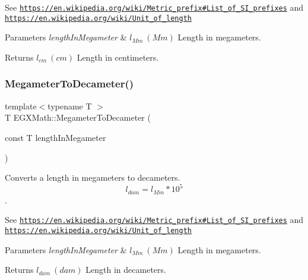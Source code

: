 See \href{https://en.wikipedia.org/wiki/Metric_prefix#List_of_SI_prefixes}{\tt https\+://en.\+wikipedia.\+org/wiki/\+Metric\+\_\+prefix\#\+List\+\_\+of\+\_\+\+S\+I\+\_\+prefixes} and \href{https://en.wikipedia.org/wiki/Unit_of_length}{\tt https\+://en.\+wikipedia.\+org/wiki/\+Unit\+\_\+of\+\_\+length} 
\begin{DoxyParams}{Parameters}
{\em length\+In\+Megameter} & $ l_{Mm}\ (Mm)$ Length in megameters. \\
\hline
\end{DoxyParams}
\begin{DoxyReturn}{Returns}
$ l_{cm}\ (cm)$ Length in centimeters. 
\end{DoxyReturn}
\mbox{\label{group___e_g_x_math-_conversions-_length_conversions-_megameter-_s_i_ga7e758185a466f8ac5f956650312b9019}} 
\subsubsection{\texorpdfstring{Megameter\+To\+Decameter()}{MegameterToDecameter()}}
{\footnotesize\ttfamily template$<$typename T $>$ \\
T E\+G\+X\+Math\+::\+Megameter\+To\+Decameter (\begin{DoxyParamCaption}\item[{const T}]{length\+In\+Megameter }\end{DoxyParamCaption})}



Converts a length in megameters to decameters. \[ l_{dam}=l_{Mm} * 10^{5} \]. 

See \href{https://en.wikipedia.org/wiki/Metric_prefix#List_of_SI_prefixes}{\tt https\+://en.\+wikipedia.\+org/wiki/\+Metric\+\_\+prefix\#\+List\+\_\+of\+\_\+\+S\+I\+\_\+prefixes} and \href{https://en.wikipedia.org/wiki/Unit_of_length}{\tt https\+://en.\+wikipedia.\+org/wiki/\+Unit\+\_\+of\+\_\+length} 
\begin{DoxyParams}{Parameters}
{\em length\+In\+Megameter} & $ l_{Mm}\ (Mm)$ Length in megameters. \\
\hline
\end{DoxyParams}
\begin{DoxyReturn}{Returns}
$ l_{dam}\ (dam)$ Length in decameters. 
\end{DoxyReturn}
\mbox{\label{group___e_g_x_math-_conversions-_length_conversions-_megameter-_s_i_gaf63f319e0852676dab85aaebc462e8a3}} 
